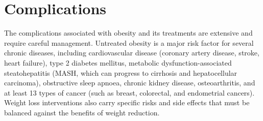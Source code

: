 \section*{Complications}
The complications associated with obesity and its treatments are extensive and require careful management. Untreated obesity is a major risk factor for several chronic diseases, including cardiovascular disease (coronary artery disease, stroke, heart failure), type 2 diabetes mellitus, metabolic dysfunction-associated steatohepatitis (MASH, which can progress to cirrhosis and hepatocellular carcinoma), obstructive sleep apnoea, chronic kidney disease, osteoarthritis, and at least 13 types of cancer (such as breast, colorectal, and endometrial cancers). Weight loss interventions also carry specific risks and side effects that must be balanced against the benefits of weight reduction.

